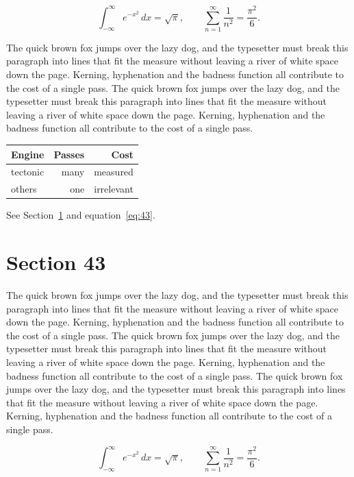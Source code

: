 \documentclass{article}
\begin{document}
\begin{equation}\label{eq:42}
\int_{-\infty}^{\infty} e^{-x^{2}}\,dx = \sqrt{\pi}, \qquad
\sum_{n=1}^{\infty} \frac{1}{n^{2}} = \frac{\pi^{2}}{6}.
\end{equation}

The quick brown fox jumps over the lazy dog, and the typesetter must break this paragraph into lines that fit the measure without leaving a river of white space down the page. Kerning, hyphenation and the badness function all contribute to the cost of a single pass. The quick brown fox jumps over the lazy dog, and the typesetter must break this paragraph into lines that fit the measure without leaving a river of white space down the page. Kerning, hyphenation and the badness function all contribute to the cost of a single pass. 

\begin{center}
\begin{tabular}{lrr}
\toprule
Engine & Passes & Cost \\
\midrule
tectonic & many & measured \\
others & one & irrelevant \\
\bottomrule
\end{tabular}
\end{center}

See Section~\ref{sec:43} and equation~\eqref{eq:43}.
\section{Section 43}
\label{sec:43}
The quick brown fox jumps over the lazy dog, and the typesetter must break this paragraph into lines that fit the measure without leaving a river of white space down the page. Kerning, hyphenation and the badness function all contribute to the cost of a single pass. The quick brown fox jumps over the lazy dog, and the typesetter must break this paragraph into lines that fit the measure without leaving a river of white space down the page. Kerning, hyphenation and the badness function all contribute to the cost of a single pass. The quick brown fox jumps over the lazy dog, and the typesetter must break this paragraph into lines that fit the measure without leaving a river of white space down the page. Kerning, hyphenation and the badness function all contribute to the cost of a single pass. 

\begin{equation}\label{eq:43}
\int_{-\infty}^{\infty} e^{-x^{2}}\,dx = \sqrt{\pi}, \qquad
\sum_{n=1}^{\infty} \frac{1}{n^{2}} = \frac{\pi^{2}}{6}.
\end{equation}
\end{document}
